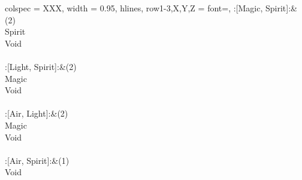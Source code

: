 \begin{longtblr}[
	caption = {2v1 Attacking Effective},
	label = {2v1-Attacking-Effective},
]{
	colspec = {XXX}, width = 0.95\linewidth,
	hlines,
	row{1-3,X,Y,Z} = {font=\bfseries},
}
	:[Magic, Spirit]:&{(2)\\
	Spirit \\
	Void \\
	}\\

	:[Light, Spirit]:&{(2)\\
	Magic \\
	Void \\
	}\\

	:[Air, Light]:&{(2)\\
	Magic \\
	Void \\
	}\\

	:[Air, Spirit]:&{(1)\\
	Void \\
	}\\

\end{longtblr}
\onecolumn
